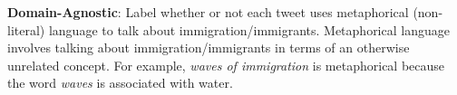\begin{table*}[htbp!]
\begin{tcolorbox}[colback=white, colframe=white!30!black, boxrule=1pt, arc=4mm, width=\textwidth, boxrule=1pt,title=Codebook,fontupper=\footnotesize]
\textbf{Domain-Agnostic}: Label whether or not each tweet uses metaphorical (non-literal) language to talk about immigration/immigrants. Metaphorical language involves talking about immigration/immigrants in terms of an otherwise unrelated concept. For example, \textit{waves of immigration} is metaphorical because the word \textit{waves} is associated with water.

\end{tcolorbox}
\end{table*}
